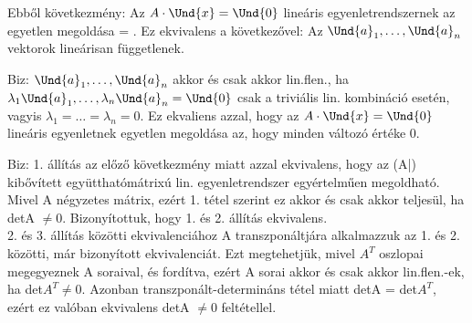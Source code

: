 Ebből következmény: Az $A \cdot \Und{x} = \Und{0}$ lineáris egyenletrendszernek az egyetlen megoldása  = . Ez ekvivalens a következővel:
Az $\Und{a}_1,\ldots,\Und{a}_n$ vektorok lineárisan függetlenek.
\begin{leftbar}
Biz: $\Und{a}_1,\ldots,\Und{a}_n$ akkor és csak akkor lin.flen., ha $\lambda_1\Und{a}_1,\ldots,\lambda_n\Und{a}_n = \Und{0}$ csak a triviális lin. kombináció esetén, vagyis $\lambda_1 = \ldots = \lambda_n = 0$. Ez ekvaliens azzal, hogy az $A \cdot \Und{x} = \Und{0}$ lineáris egyenletnek egyetlen megoldása az, hogy minden változó értéke 0.
\end{leftbar}
\begin{leftbar}
Biz: 1. állítás az előző következmény miatt azzal ekvivalens, hogy az (A|) kibővített együtthatómátrixú lin. egyenletrendszer egyértelműen megoldható. Mivel A négyzetes mátrix, ezért 1. tétel szerint ez akkor és csak akkor teljesül, ha detA $\neq 0$. Bizonyítottuk, hogy 1. és 2. állítás ekvivalens.\\
2. és 3. állítás közötti ekvivalenciához A transzponáltjára alkalmazzuk az 1. és 2. közötti, már bizonyított ekvivalenciát. Ezt megtehetjük, mivel $A^T$ oszlopai megegyeznek A soraival, és fordítva, ezért A sorai akkor és csak akkor lin.flen.-ek, ha det$A^T \neq 0$. Azonban transzponált-determináns tétel miatt detA = det$A^T$, ezért ez valóban ekvivalens detA $\neq 0$ feltétellel.
\end{leftbar}
